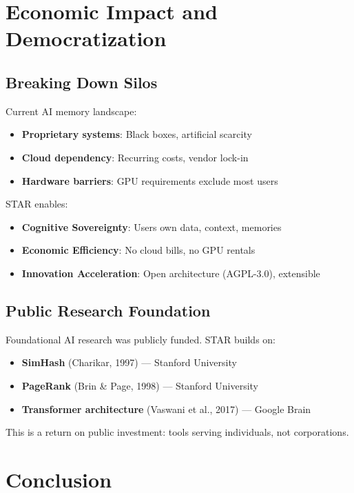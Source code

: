 \documentclass[11pt]{article}
\begin{document}
\section{Economic Impact and Democratization}
\label{sec:economic}

\subsection{Breaking Down Silos}

Current AI memory landscape:
\begin{itemize}
    \item \textbf{Proprietary systems}: Black boxes, artificial scarcity
    \item \textbf{Cloud dependency}: Recurring costs, vendor lock-in
    \item \textbf{Hardware barriers}: GPU requirements exclude most users
\end{itemize}

STAR enables:
\begin{itemize}
    \item \textbf{Cognitive Sovereignty}: Users own data, context, memories
    \item \textbf{Economic Efficiency}: No cloud bills, no GPU rentals
    \item \textbf{Innovation Acceleration}: Open architecture (AGPL-3.0), extensible
\end{itemize}

\subsection{Public Research Foundation}

Foundational AI research was publicly funded. STAR builds on:
\begin{itemize}
    \item \textbf{SimHash} (Charikar, 1997) --- Stanford University
    \item \textbf{PageRank} (Brin \& Page, 1998) --- Stanford University
    \item \textbf{Transformer architecture} (Vaswani et al., 2017) --- Google Brain
\end{itemize}

This is a return on public investment: tools serving individuals, not corporations.

\section{Conclusion}
\label{sec:conclusion}
\end{document}
